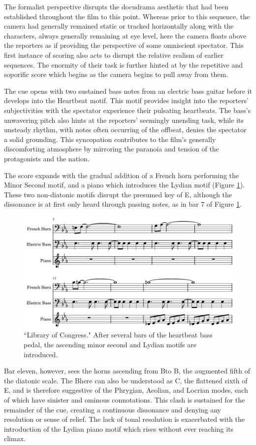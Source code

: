 The formalist perspective disrupts the docudrama aesthetic that had been established throughout the film to this point.
Whereas prior to this sequence, the camera had generally remained static or tracked horizontally along with the characters, always generally remaining at eye level, here the camera floats above the reporters as if providing the perspective of some omniscient spectator.
This first instance of scoring also acts to disrupt the relative realism of earlier sequences.
The enormity of their task is further hinted at by the repetitive and soporific score which begins as the camera begins to pull away from them.

The cue opens with two sustained bass notes from an electric bass guitar before it develops into the Heartbeat motif.
This motif provides insight into the reporters' subjectivities with the spectator experience their pulsating heartbeats.
The bass's unwavering pitch also hints at the reporters' seemingly unending task, while its unsteady rhythm, with notes often occurring of the offbeat, denies the spectator a solid grounding.
This syncopation contributes to the film's generally discomforting atmosphere by mirroring the paranoia and tension of the protagonists and the nation.

The score expands with the gradual addition of a French horn performing the Minor Second motif, and a piano which introduces the Lydian motif (Figure \ref{fig:president-library-cue}).
These two non-diatonic motifs disrupt the presumed key of E\flat, although the dissonance is at first only heard through passing notes, as in bar 7 of Figure \ref{fig:president-library-cue}.
\begin{figure}
    \centering
    \includegraphics[width=0.75\linewidth]{img/president-library-cue.pdf}
    \caption{``Library of Congress." After several bars of the heartbeat bass pedal, the ascending minor second and Lydian motifs are introduced.}
    \label{fig:president-library-cue}
\end{figure}
Bar eleven, however, sees the horns ascending from B\flat to B\natural, the augmented fifth of the diatonic scale.
The B\natural here can also be understood as C\flat, the flattened sixth of E\flat, and is therefore suggestive of the Phrygian, Aeolian, and Locrian modes, each of which have sinister and ominous connotations.
This clash is sustained for the remainder of the cue, creating a continuous dissonance and denying any resolution or sense of relief.
The lack of tonal resolution is exacerbated with the introduction of the Lydian piano motif which rises without ever reaching its climax.

